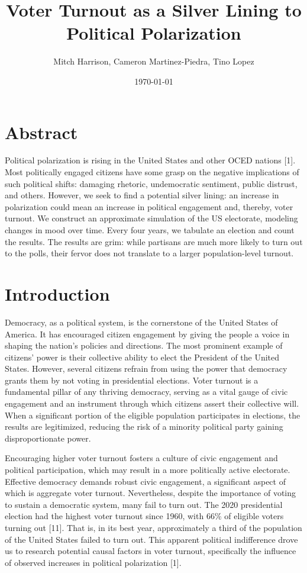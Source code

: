 \documentclass[titlepage, 12pt, leqno]{article} %
\title{\Huge{Voter Turnout as a Silver Lining to Political Polarization}}
\author{\large{Mitch Harrison, Cameron Martinez-Piedra, Tino Lopez}}
\date{\today}
\begin{document}
\setlength{\parskip}{1\baselineskip}
\setlength{\parindent}{15pt}
\maketitle
\tableofcontents
\doublespacing
\newpage


\section{Abstract}

Political polarization is rising in the United States and other OCED nations 
[1]. Most politically engaged citizens have some grasp on the negative
implications of such political shifts: damaging rhetoric, undemocratic 
sentiment, public distrust, and others. However, we seek to find a potential
silver lining: an increase in polarization could mean an increase in political
engagement and, thereby, voter turnout. We construct an approximate simulation
of the US electorate, modeling changes in mood over time. Every four years, we
tabulate an election and count the results. The results are grim: while 
partisans are much more likely to turn out to the polls, their fervor does not
translate to a larger population-level turnout.

\section{Introduction}
Democracy, as a political system, is the cornerstone of the United States of
America. It has encouraged citizen engagement by giving the people a voice in
shaping the nation's policies and directions. The most prominent example of
citizens' power is their collective ability to elect the President of the 
United States. However, several citizens refrain from using the power that
democracy grants them by not voting in presidential elections. Voter turnout 
is a fundamental pillar of any thriving democracy, serving as a vital gauge of
civic engagement and an instrument through which citizens assert their 
collective will. When a significant portion of the eligible population
participates in elections, the results are legitimized, reducing the risk of a
minority political party gaining disproportionate power. 

Encouraging higher voter turnout fosters a culture of civic engagement and
political participation, which may result in a more politically active
electorate. Effective democracy demands robust civic engagement, a significant
aspect of which is aggregate voter turnout. Nevertheless, despite the
importance of voting to sustain a democratic system, many fail to turn out.
The 2020 presidential election had the highest voter turnout since 1960, with
66\% of eligible voters turning out [11]. That is, in its best year,
approximately a third of the population of the United States failed to turn
out. This apparent political indifference drove us to research potential causal
factors in voter turnout, specifically the influence of observed increases in
political polarization [1].
\end{document}
